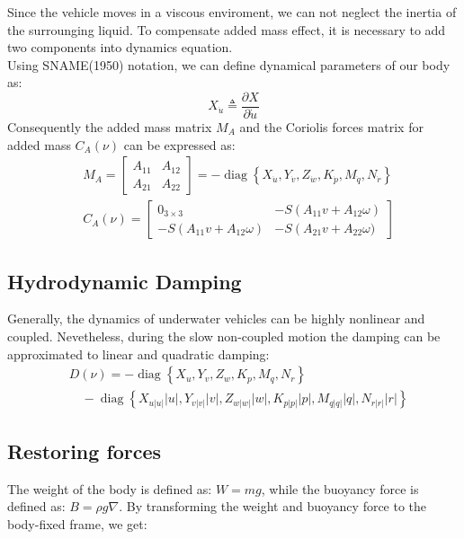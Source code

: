     Since the vehicle moves in a viscous enviroment, we can not neglect the inertia of the surrounging liquid.
    To compensate added mass effect, it is necessary to add two components into dynamics equation.\\
    Using SNAME(1950) notation, we can define dynamical parameters of our body as:
    $$
    X_{\dot{u}} \triangleq \frac{\partial X}{\partial \dot{u}}
    $$
    Consequently the added mass matrix $M_A$ and 
    the Coriolis forces matrix for added mass $C_A(\nu)$
    can be expressed as: 
    $$
    \begin{aligned}
        & M_A=\left[\begin{array}{cc}
            A_{11} & A_{12} \\
            A_{21} & A_{22}
            \end{array}\right]=-\operatorname{diag}\left\{X_{\dot{u}}, Y_{\dot{v}}, Z_{\dot{w}}, K_{\dot{p}}, M_{\dot{q}}, N_{\dot{r}}\right\} \\
        & C_A(\nu)=\left[\begin{array}{cc}
        0_{3 \times 3} & -S\left(A_{11} v+A_{12} \omega\right) \\
        -S\left(A_{11} v+A_{12} \omega\right) & -S\left(A_{21} v+A_{22} \omega)\right.
        \end{array}\right]
    \end{aligned}
    $$

\subsection{Hydrodynamic Damping}

    Generally, the dynamics of underwater vehicles can be highly nonlinear and coupled.
    Nevetheless, during the slow non-coupled motion the damping can be approximated to linear and quadratic damping:
    $$\begin{aligned}
        & D(\nu)=-\operatorname{diag}\left\{X_u, Y_v, Z_w, K_p, M_q, N_r\right\} \\
        & \quad-\operatorname{diag}\left\{X_{u|u|}|u|, Y_{v|v|}|v|, Z_{w|w|}|w|, K_{p|p|}|p|, M_{q|q|}|q|, N_{r|r|}|r|\right\}
    \end{aligned}
    $$

\subsection{Restoring forces}
The weight of the body is defined as: $W=m g$, 
while the buoyancy force is defined as: $B=\rho g \nabla$. 
By transforming the weight and buoyancy force to the body-fixed frame, we get:

